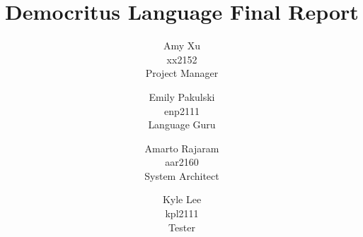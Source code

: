 \documentclass{report}
\author{
  Amy Xu \\ \small{xx2152} \\ \small{Project Manager}
  \and Emily Pakulski \\ \small{enp2111} \\ \small{Language Guru}
  \and Amarto Rajaram \\ \small{aar2160}  \\ \small{System Architect}
  \and Kyle Lee\\ \small{kpl2111} \\ \small{Tester}
}
\title{Democritus Language Final Report}
\begin{document}
	\maketitle
	\tableofcontents
	\pagebreak
  
  
  
  
  
  
  
  
  
	
\end{document}
